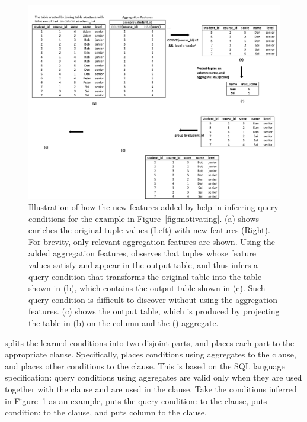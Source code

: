 

\begin{figure}[t]
  \centering
  \includegraphics[scale=0.65]{fullexample}
  \vspace*{-2.0ex}\caption {{\label{fig:fullexample}
  Illustration of how the new features added by \ourtool
  help in inferring query conditions for the example in Figure~\ref{fig:motivating}.
  (a) shows \ourtool
  enriches the original tuple values (Left)
  with new features (Right). For brevity, only relevant
  aggregation features are shown. Using the added aggregation
  features, \ourtool observes that tuples whose feature values satisfy
   and 
  appear in the output table,
  and thus infers a query condition that
  transforms the original table into the table shown in (b),
  which contains the output table shown in (c).
  Such query condition is difficult to discover 
  without using the aggregation features.
  (c) shows the output table, which is produced by projecting the
   table in (b) on the  column and the
  () aggregate.}}

\end{figure}


\ourtool splits the learned conditions into two disjoint parts,
and places each part to the appropriate clause.
Specifically, \ourtool places conditions
using aggregates to the 
clause, and places other conditions to the  clause.
This is based on the SQL language specification:
query conditions using aggregates are valid only when they
are used {together with} the  clause
and are used in the  clause.
Take the conditions inferred in Figure~\ref{fig:fullexample}
as an example, \ourtool puts the query
condition: 
to the  clause,
puts condition: 
to the  clause, and puts 
column  to the  clause.




